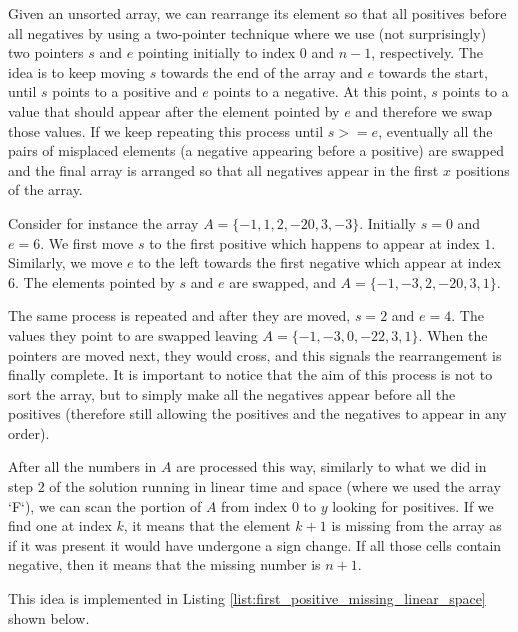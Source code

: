 Given an unsorted array, we can rearrange its element so that all positives before all negatives by using a two-pointer technique where we use (not surprisingly) two pointers $s$ and $e$ pointing initially to index $0$ and $n-1$, respectively.
The idea is to keep moving $s$ towards the end of the array and $e$ towards the start, until $s$ points to a positive and $e$ points to a negative. At this point, $s$ points to a value that should appear after the element pointed by $e$ and therefore we swap those values. 
If we keep repeating this process until $s>=e$, eventually all the pairs of misplaced elements (a negative appearing before a positive) are swapped and the final array is arranged so that all negatives appear in the first $x$ positions of the array.

Consider for instance the array $A=\{-1, 1, 2,-2 0,3,-3\}$. Initially $s=0$ and $e=6$. We first move $s$ to the first positive which happens to appear at index $1$. Similarly, we move $e$ to the left towards the first negative which appear at index $6$. The elements pointed by $s$ and $e$ are swapped, and $A=\{-1, -3, 2,-2 0,3,1\}$.

The same process is repeated and after they are moved, $s=2$ and $e=4$. 
The values they point to are swapped leaving $A=\{-1, -3, 0,-2 2,3,1\}$. When the pointers are moved next, they would cross, and this signals the rearrangement is finally complete. It is important to notice that the aim of this process is not to sort the array, but to simply make all the negatives appear before all the positives (therefore still allowing the positives and the negatives to appear in any order).


After all the numbers in $A$ are processed this way, similarly to what we did in step $2$ of the solution running in linear time and space (where we used the array `F`), we can scan the portion of $A$ from index $0$ to $y$ looking for positives. 
If we find one at index $k$, it means that the element $k+1$ is missing from the array as if it was present it would have undergone a sign change. 
If all those cells contain negative, then it means that the missing number is $n+1$.

This idea is implemented in Listing \ref{list:first_positive_missing_linear_space} shown below.



